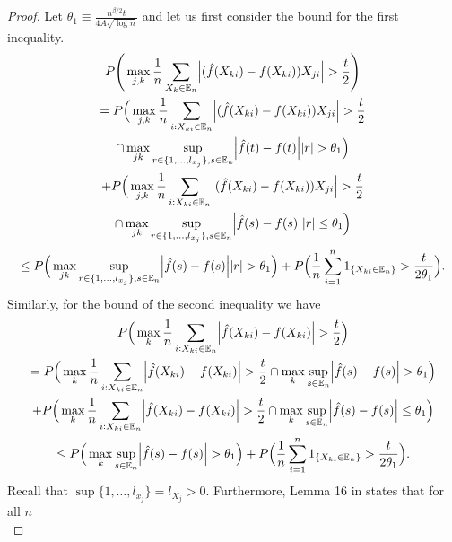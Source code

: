 \begin{lemma}
    \begin{proof}
        Let $\theta_1 \equiv \frac{n^{\beta/2}t}{4A\sqrt{\log n}}$ and let us first consider the bound for the first inequality.
        \begin{multline*}
            P\Bigg(\max_{j,k} \frac{1}{n} \sum_{X_k \in \mathbb{E}_n} \abs{(\hat{f}(X_{ki}) - f(X_{ki}))X_{ji}} > \frac{t}{2}\Bigg) \\
            =  P\Big(\max_{j,k} \frac{1}{n} \sum_{i: X_{ki} \in \mathbb{E}_n} \abs{(\hat{f}(X_{ki}) - f(X_{ki}))X_{ji}} > \frac{t}{2} \\
            \cap \max_{jk} \sup_{r \in \{1,\dots,l_{x_j}\}, s \in \mathbb{E}_n} \abs{\hat{f}(t) - f(t)}\abs{r} > \theta_1 \Big) \\
            + P\Big(\max_{j,k} \frac{1}{n} \sum_{i: X_{ki} \in \mathbb{E}_n} \abs{(\hat{f}(X_{ki}) - f(X_{ki}))X_{ji}} > \frac{t}{2} \\
            \cap \max_{jk} \sup_{r \in \{1,\dots,l_{x_j}\}, s \in \mathbb{E}_n} \abs{\hat{f}(s) - f(s)}\abs{r} \leq \theta_1 \Big) \\
            \leq P\Big(\max_{jk} \sup_{r \in \{1,\dots,l_{x_j}\}, s \in \mathbb{E}_n} \abs{\hat{f}(s) - f(s)}\abs{r} > \theta_1 \Big) + P\Big(\frac{1}{n} \sum_{i = 1}^n 1_{\{X_{ki} \in \mathbb{E}_n\}} > \frac{t}{2\theta_1}\Big).
        \end{multline*}
        Similarly, for the bound of the second inequality we have 
        \begin{multline*}
            P\Big(\max_k \frac{1}{n} \sum_{i: X_{ki} \in \mathbb{E}_n} \abs{\hat{f}(X_{ki}) - f(X_{ki})} > \frac{t}{2}\Big) \\
            =  P\Big(\max_k \frac{1}{n} \sum_{i: X_{ki} \in \mathbb{E}_n} \abs{\hat{f}(X_{ki}) - f(X_{ki})} > \frac{t}{2} \cap \max_k \sup_{s \in \mathbb{E}_n} \abs{\hat{f}(s) - f(s)} > \theta_1 \Big) \\
            + P\Big(\max_k \frac{1}{n} \sum_{i: X_{ki} \in \mathbb{E}_n} \abs{\hat{f}(X_{ki}) - f(X_{ki})} > \frac{t}{2} \cap \max_k \sup_{s \in \mathbb{E}_n} \abs{\hat{f}(s) - f(s)} \leq \theta_1\Big) \\
            \leq P\Big(\max_k \sup_{s \in \mathbb{E}_n} \abs{\hat{f}(s) - f(s)} > \theta_1 \Big) + P\Big(\frac{1}{n} \sum_{i = 1}^n 1_{\{X_{ki} \in \mathbb{E}_n\}} > \frac{t}{2\theta_1}\Big).
        \end{multline*}
        Recall that $\sup\{1,\dots,l_{x_j}\} = l_{X_j} > 0$. Furthermore, Lemma 16 in \citet{Liu09} states that for all $n$ 
        \begin{equation}

\end{equation}
\end{proof}
\end{lemma}
